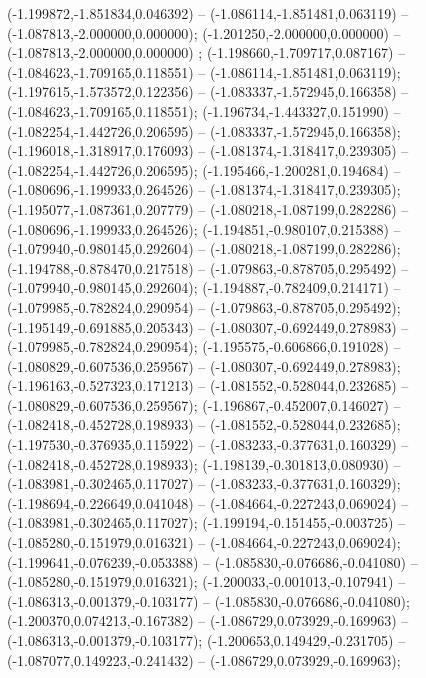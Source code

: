  (-1.199872,-1.851834,0.046392) -- (-1.086114,-1.851481,0.063119) -- (-1.087813,-2.000000,0.000000);
 (-1.201250,-2.000000,0.000000) -- (-1.087813,-2.000000,0.000000) ;
 (-1.198660,-1.709717,0.087167) -- (-1.084623,-1.709165,0.118551) -- (-1.086114,-1.851481,0.063119);
 (-1.197615,-1.573572,0.122356) -- (-1.083337,-1.572945,0.166358) -- (-1.084623,-1.709165,0.118551);
 (-1.196734,-1.443327,0.151990) -- (-1.082254,-1.442726,0.206595) -- (-1.083337,-1.572945,0.166358);
 (-1.196018,-1.318917,0.176093) -- (-1.081374,-1.318417,0.239305) -- (-1.082254,-1.442726,0.206595);
 (-1.195466,-1.200281,0.194684) -- (-1.080696,-1.199933,0.264526) -- (-1.081374,-1.318417,0.239305);
 (-1.195077,-1.087361,0.207779) -- (-1.080218,-1.087199,0.282286) -- (-1.080696,-1.199933,0.264526);
 (-1.194851,-0.980107,0.215388) -- (-1.079940,-0.980145,0.292604) -- (-1.080218,-1.087199,0.282286);
 (-1.194788,-0.878470,0.217518) -- (-1.079863,-0.878705,0.295492) -- (-1.079940,-0.980145,0.292604);
 (-1.194887,-0.782409,0.214171) -- (-1.079985,-0.782824,0.290954) -- (-1.079863,-0.878705,0.295492);
 (-1.195149,-0.691885,0.205343) -- (-1.080307,-0.692449,0.278983) -- (-1.079985,-0.782824,0.290954);
 (-1.195575,-0.606866,0.191028) -- (-1.080829,-0.607536,0.259567) -- (-1.080307,-0.692449,0.278983);
 (-1.196163,-0.527323,0.171213) -- (-1.081552,-0.528044,0.232685) -- (-1.080829,-0.607536,0.259567);
 (-1.196867,-0.452007,0.146027) -- (-1.082418,-0.452728,0.198933) -- (-1.081552,-0.528044,0.232685);
 (-1.197530,-0.376935,0.115922) -- (-1.083233,-0.377631,0.160329) -- (-1.082418,-0.452728,0.198933);
 (-1.198139,-0.301813,0.080930) -- (-1.083981,-0.302465,0.117027) -- (-1.083233,-0.377631,0.160329);
 (-1.198694,-0.226649,0.041048) -- (-1.084664,-0.227243,0.069024) -- (-1.083981,-0.302465,0.117027);
 (-1.199194,-0.151455,-0.003725) -- (-1.085280,-0.151979,0.016321) -- (-1.084664,-0.227243,0.069024);
 (-1.199641,-0.076239,-0.053388) -- (-1.085830,-0.076686,-0.041080) -- (-1.085280,-0.151979,0.016321);
 (-1.200033,-0.001013,-0.107941) -- (-1.086313,-0.001379,-0.103177) -- (-1.085830,-0.076686,-0.041080);
 (-1.200370,0.074213,-0.167382) -- (-1.086729,0.073929,-0.169963) -- (-1.086313,-0.001379,-0.103177);
 (-1.200653,0.149429,-0.231705) -- (-1.087077,0.149223,-0.241432) -- (-1.086729,0.073929,-0.169963);
